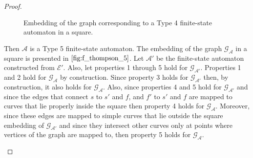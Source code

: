 \begin{proof}
\begin{case}[$\mathcal{E} = \mathcal{E}'+\mathcal{E}''$ where $\mathcal{E}'$ and
    $\mathcal{E}''$ are regular expressions]
    \begin{figure}[!h]
      \centering
      \caption{Embedding of the graph corresponding to a Type 4 finite-state
      automaton in a square.}
      \label{fig:f_thompson_4}
    \end{figure}
  \end{case}

  \begin{case}[$\mathcal{E} = \mathcal{E}'*$ where $\mathcal{E}'$ is a regular
    expression]
    Then $\mathcal{A}$ is a Type 5 finite-state automaton. The embedding of the graph
    $\mathcal{G}_{\mathcal{A}}$ in a square is presented in
    $\Cref{fig:f_thompson_5}$. Let $\mathcal{A}'$ be the finite-state automaton
    constructed from $\mathcal{E}'$. Also, let properties 1 through 5 hold for
    $\mathcal{G}_\mathcal{A'}$. Properties 1 and 2 hold for
    $\mathcal{G}_{\mathcal{A}}$ by construction. Since property 3 holds for
    $\mathcal{G}_\mathcal{A'}$ then, by construction, it also holds for
    $\mathcal{G}_\mathcal{A}$. Also, since properties 4 and 5 hold for
    $\mathcal{G}_\mathcal{A'}$ and since the edges that connect $s$ to $s'$ and $f$,
    and $f'$ to $s'$ and $f$ are mapped to curves that lie properly inside the square
    then property 4 holds for $\mathcal{G}_\mathcal{A}$. Moreover, since these edges
    are mapped to simple curves that lie outside the square embedding of
    $\mathcal{G}_\mathcal{A'}$ and since they intersect other curves only at points
    where vertices of the graph are mapped to, then property 5 holds for
    $\mathcal{G}_\mathcal{A}$.


\end{case}
\end{proof}
